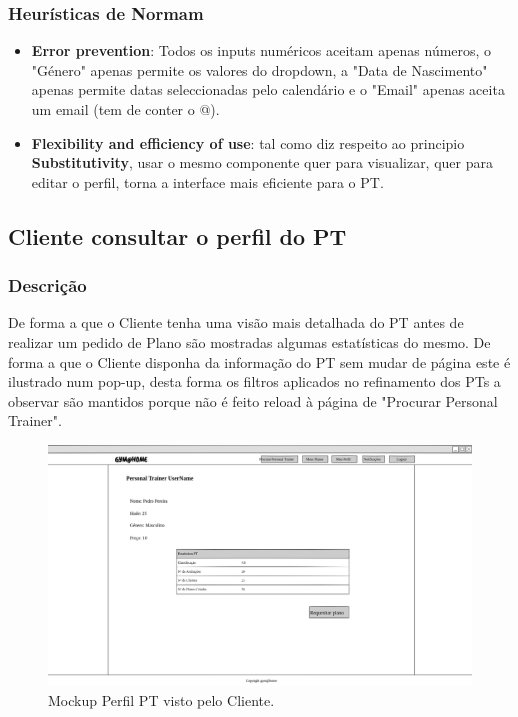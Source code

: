 \subsubsection{Heurísticas de Normam}
\begin{itemize}
    \item \textbf{Error prevention}: Todos os inputs numéricos aceitam apenas números, o "Género" apenas permite os valores do dropdown, a "Data de Nascimento" apenas permite datas seleccionadas pelo calendário e o "Email" apenas aceita um email (tem de conter o @).
    \item \textbf{Flexibility and efficiency of use}: tal como diz respeito ao principio \textbf{Substitutivity}, usar o mesmo componente quer para visualizar, quer para editar o perfil, torna a interface mais eficiente para o PT.
\end{itemize}

\subsection{Cliente consultar o perfil do PT}
\label{subsec:perfilptbycliente}

\subsubsection{Descrição}
\hspace{5mm} De forma a que o Cliente tenha uma visão mais detalhada do PT antes de realizar um pedido de Plano são mostradas algumas estatísticas do mesmo. De forma a que o Cliente disponha da informação do PT sem mudar de página este é ilustrado num pop-up, desta forma os filtros aplicados no refinamento dos PTs a observar são mantidos porque não é feito reload à página de "Procurar Personal Trainer".

\begin{figure}[H]
    \centering
    \includegraphics[scale=0.25]{images/mockups/cliente_perfil_personal_trainer.png}
    \caption{Mockup Perfil PT visto pelo Cliente.}
    \label{fig:mockupperfilptbycliente}
\end{figure}

